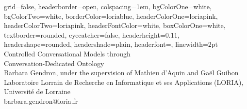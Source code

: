 \documentclass[a0paper,portrait]{baposter}
\begin{document}

\begin{poster}
{
grid=false,
headerborder=open, %
colspacing=1em, %
bgColorOne=white, %
bgColorTwo=white, %
borderColor=loriablue, %
headerColorOne=loriapink, %
headerColorTwo=loriapink, %
headerFontColor=white, %
boxColorOne=white, %
textborder=rounded, %
eyecatcher=false, %
headerheight=0.11\textheight, %
headershape=rounded, %
headershade=plain,
headerfont=\Large\textsf, %
linewidth=2pt %
}
{}
%
%
{\textsf{Controlled Conversational Models through \\ Conversation-Dedicated Ontology}}
{\sf\vspace{0.3em}\\
Barbara Gendron, under the supervision of Mathieu d'Aquin and Gaël Guibon
\vspace{0.1em}\\
\small{Laboratoire Lorrain de Recherche en Informatique et ses Applications (LORIA), Université de Lorraine
\vspace{0.2em}\\
barbara.gendron@loria.fr
}}
{
}%


\end{poster}
\end{document}
